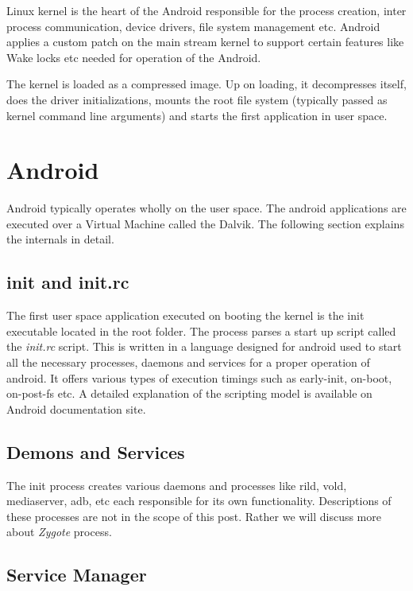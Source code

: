 Linux kernel is the heart of the Android responsible for the process
creation, inter process communication, device drivers, file system
management etc. Android applies a custom patch on the main stream
kernel to support certain features like Wake locks etc needed for
operation of the Android.

The kernel is loaded as a compressed image. Up on loading, it decompresses itself,
does the driver initializations, mounts the root file system (typically passed 
as kernel command line arguments) and starts the first application in user space.


\section{Android}

Android typically operates wholly on the user space. The android applications are executed over a Virtual Machine called the Dalvik. The following section explains the internals in detail.

\subsection{init and init.rc}

The first user space application executed on booting the kernel is the init
executable located in the root folder. The process parses a start up script
called the \textit{init.rc} script. This is written in a language designed
for android used to start all the necessary processes, daemons and services
for a proper operation of android. It offers various types of execution timings
such as early-init, on-boot, on-post-fs etc. A detailed explanation of the
scripting model is available on Android documentation site.

\subsection{Demons and Services}

The init process creates various daemons and processes like rild, vold,
mediaserver, adb, etc each responsible for its own functionality.
Descriptions of these processes are not in the scope of this post.
Rather we will discuss more about \textit{Zygote} process.

\subsection{Service Manager}

